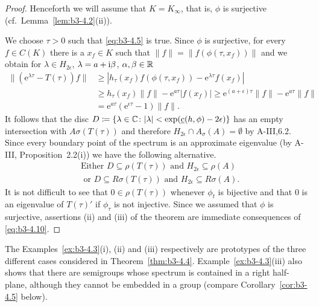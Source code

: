 \begin{proof}
	Henceforth we will assume that $K = K_{\infty}$, that is, $\phi$ is surjective (cf.\ Lemma~\ref{lem:b3-4.2}(ii)).
	
	We choose $\tau > 0$ such that \eqref{eq:b3-4.5} is true.
	Since $\phi$ is surjective, for every $f \in C(K)$ there is a $x_{f} \in K$ such that $\|f\| = \|f(\phi(\tau,x_{f}))\|$ and we obtain for $\lambda \in H_{2\epsilon}$, $\lambda = a + \mathrm{i}\beta$, $\alpha,\beta \in \mathbb{R}$
	\begin{equation}\label{eq:b3-4.9}
		\begin{aligned}
			\|(\mathrm{e}^{\lambda\tau} - T(\tau))f\| &\geq |h_{\tau}(x_{f})f(\phi(\tau,x_{f})) - \mathrm{e}^{\lambda\tau}f(x_{f})| \\
			& \geq h_{\tau}(x_{f})\|f\| - \mathrm{e}^{a\tau}|f(x_{f})| 
			 \geq \mathrm{e}^{(a+\epsilon)\tau}\|f\| - \mathrm{e}^{a\tau}\|f\| \\
			&= \mathrm{e}^{a\tau}(\mathrm{e}^{\epsilon\tau} - 1)\|f\|.
		\end{aligned}
	\end{equation}
	It follows that the disc $D \coloneq \{\lambda \in \mathbb{C} \colon |\lambda| < \exp(\underbar{c}(h,\phi)-2\epsilon)\}$ has an empty intersection with $A{\sigma}(T(\tau))$ and therefore $H_{2\epsilon}\cap A_{\sigma}(A) = \emptyset$ by A-III,6.2.
	Since every boundary point of the spectrum is an approximate eigenvalue (by A-III, Proposition~2.2(i)) we have the following alternative.
	\begin{equation}\label{eq:b3-4.10}
		\begin{aligned}
		&\text{Either } D \subseteq \rho(T(\tau)) \text{ and } H_{2\epsilon} \subseteq \rho(A) \\
		&\text{ or } D \subseteq R{\sigma}(T(\tau)) \text{ and } H_{2\epsilon} \subseteq R{\sigma}(A).
	\end{aligned}
	\end{equation}
	It is not difficult to see that $0 \in \rho(T(\tau))$ whenever $\phi_{t}$ is bijective and that $0$ is an eigenvalue of $T(\tau)'$ if $\phi_{\tau}$ is not injective.
	Since we assumed that $\phi$ is surjective, assertions (ii) and (iii) of the theorem are immediate consequences of \eqref{eq:b3-4.10}.
\end{proof}
The Examples~\ref{ex:b3-4.3}(i), (ii) and (iii) respectively are prototypes of the three different cases considered in Theorem~\ref{thm:b3-4.4}.
Example~\ref{ex:b3-4.3}(iii) also shows that there are semigroups whose spectrum is contained in a right half-plane, although they cannot be embedded in a group (compare Corollary~\ref{cor:b3-4.5} below).
